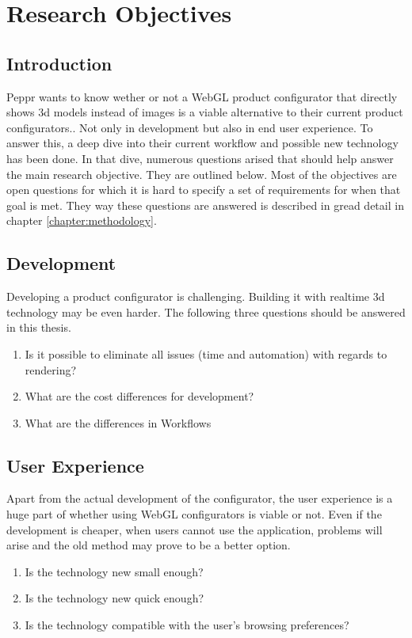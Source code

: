 \chapter{Research Objectives}
\section{Introduction}
Peppr wants to know wether or not a WebGL product configurator that directly shows 3d models instead of images is a viable alternative to their current product configurators.. Not only in development but also in end user experience. To answer this, a deep dive into their current workflow and possible new technology has been done. In that dive, numerous questions arised that should help answer the main research objective. They are outlined below. Most of the objectives are open questions for which it is hard to specify a set of requirements for when that goal is met. They way these questions are answered is described in gread detail in chapter \ref{chapter:methodology}.
\section{Development}
Developing a product configurator is challenging. Building it with realtime 3d technology may be even harder. The following three questions should be answered in this thesis.
​\begin{enumerate}
\item {Is it possible to eliminate all issues (time and automation) with regards to rendering?}
\item{What are the cost differences for development?}
\item {What are the differences in Workflows}
\end{enumerate}

\section{User Experience}
Apart from the actual development of the configurator, the user experience is a huge part of whether using WebGL configurators is viable or not. Even if the development is cheaper, when users cannot use the application, problems will arise and the old method may prove to be a better option.\begin{enumerate}
\item {Is the technology new small enough?}
\item {Is the technology new quick enough?}
\item {Is the technology compatible with the user's browsing preferences?}
\end{enumerate}